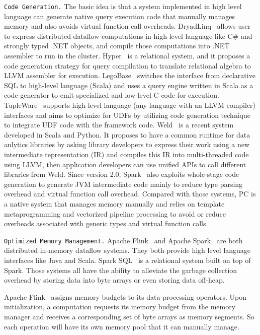 \vspace{5pt}
\texttt{Code Generation.} The basic idea is that a system implemented in high level language
can generate native query execution code that manually manages
memory and also avoids virtual function call
overheads. DryadLinq~\cite{yu2008dryadlinq} allows user to express distributed dataflow
computations in high-level language like C\# and strongly typed .NET
objects, and compile those computations into .NET assembler to run in
the cluster. Hyper~\cite{neumann2011efficiently} is a relational system,
and it proposes a code
generation strategy for query compilation to translate relational
algebra to LLVM assembler for execution.  LegoBase~\cite{klonatos2014building} switches the interface
from declarative SQL to high-level language (Scala) and uses a query engine
written in Scala as a code generator to emit specialized and low-level
C code for execution. TupleWare~\cite{crotty2015tupleware} supports
high-level language (any language with an LLVM compiler) interfaces
and aims to
optimize for UDFs by utilizing code
generation technique to integrate UDF code with the framework
code. 
Weld~\cite{palkar2017weld} is a recent system developed in Scala and
Python. It proposes
to have a common runtime for data anlytics libraries by asking library
developers to express their work using a new intermediate
representation (IR) and compiles this IR into multi-threaded code using
LLVM, then application developers can use unified APIs to
call different libraries from Weld. Since version 2.0, Spark~\cite{zaharia2012resilient}
also exploits whole-stage code generation to generate JVM intermediate
code mainly to reduce type parsing overhead and virtual function call
overhead. Compared with those systems, PC is a native system that
manages memory manually and
relies on template metaprogramming and vectorized pipeline processing
to avoid or reduce overheads associated with generic types and virtual
function calls.

\vspace{5pt}
\texttt {Optimized Memory Management.} 
Apache Flink~\cite{alexandrov2014stratosphere} and Apache
Spark~\cite{zaharia2012resilient} are both distributed in-memory
dataflow systems. They both provide high level language interfaces like Java and Scala.
Spark SQL~\cite{armbrust2015spark} is a relational system built on top
of Spark. Those systems all have the
ability to alleviate the garbage collection overhead  by storing data
into byte arrays or even storing data off-heap.

Apache Flink~\cite{alexandrov2014stratosphere} assigns memory budgets to its data processing operators. Upon
initialization, a computation requests its memory budget from the
memory manager and receives a corresponding set of byte arrays as memory segments. So
each operation will have its own memory pool that it can manually
manage. 

